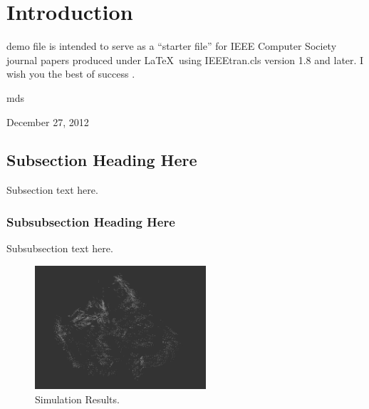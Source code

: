 \documentclass[12pt,journal,compsoc]{IEEEtran}
\begin{document}
\maketitle

\section{Introduction}

 demo file is intended to serve as a ``starter file''
for IEEE Computer Society journal papers produced under \LaTeX\ using
IEEEtran.cls version 1.8 and later.
I wish you the best of success \cite{1}.

\hfill mds
 
\hfill December 27, 2012

\subsection{Subsection Heading Here}
Subsection text here.


\subsubsection{Subsubsection Heading Here}
Subsubsection text here.


\begin{figure}[!t]
\centering
\includegraphics[width=2.5in]{femur_2}
\caption{Simulation Results.}
\label{fig_sim}
\end{figure}
\end{document}
